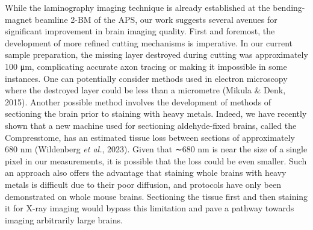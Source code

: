 \documentclass{article}
\begin{document}
While the laminography imaging technique is already established at the bending-magnet beamline 2-BM of the APS, our work suggests several avenues for significant improvement in brain imaging quality. First and foremost, the development of more refined cutting mechanisms is imperative. In our current sample preparation, the missing layer destroyed during cutting was approximately 100 μm, complicating accurate axon tracing or making it impossible in some instances. One can potentially consider methods used in electron microscopy where the destroyed layer could be less than a micrometre (Mikula \& Denk, 2015). Another possible method involves the development of methods of sectioning the brain prior to staining with heavy metals. Indeed, we have recently shown that a new machine used for sectioning aldehyde-fixed brains, called the Compresstome, has an estimated tissue loss between sections of approximately 680 nm (Wildenberg \emph{et al.}, 2023). Given that ∼680 nm is near the size of a single pixel in our measurements, it is possible that the loss could be even smaller. Such an approach also offers the advantage that staining whole brains with heavy metals is difficult due to their poor diffusion, and protocols have only been demonstrated on whole mouse brains. Sectioning the tissue first and then staining it for X-ray imaging would bypass this limitation and pave a pathway towards imaging arbitrarily large brains.
\end{document}
